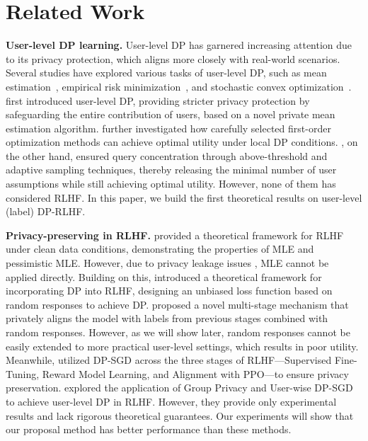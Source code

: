 \section{Related Work}
\noindent \textbf{User-level DP learning. }
User-level DP has garnered increasing attention due to its privacy protection, which aligns more closely with real-world scenarios. Several studies have explored various tasks of user-level DP, such as mean estimation~\cite{userleveldp1}, empirical risk minimization~\cite{userleveldp1}, and stochastic convex optimization~\cite{userleveldp2,userleveldp}. \citealt{userleveldp1} first introduced user-level DP, providing stricter privacy protection by safeguarding the entire contribution of users, based on a novel private mean estimation algorithm. \citealt{userleveldp2} further investigated how carefully selected first-order optimization methods can achieve optimal utility under local DP conditions. \citealt{userleveldp}, on the other hand, ensured query concentration through above-threshold and adaptive sampling techniques, thereby releasing the minimal number of user assumptions while still achieving optimal utility. However, none of them has considered RLHF. In this paper, we build the first theoretical results on user-level (label) DP-RLHF. 

\noindent \textbf{Privacy-preserving in RLHF.}
\citealt{kwise} provided a theoretical framework for RLHF under clean data conditions, demonstrating the properties of MLE and pessimistic MLE. However, due to privacy leakage issues \cite{li2023multi}, MLE cannot be applied directly. Building on this, \citealt{rewarddp} introduced a theoretical framework for incorporating DP into RLHF, designing an unbiased loss function based on random responses to achieve DP.   \citealt{PROPSdp} proposed a novel multi-stage mechanism that privately aligns the model with labels from previous stages combined with random responses. However, as we will show later, random responses cannot be easily extended to more practical user-level settings, which results in poor utility. Meanwhile, \citealt{rlhfdp23} utilized DP-SGD across the three stages of RLHF—Supervised Fine-Tuning, Reward Model Learning, and Alignment with PPO—to ensure privacy preservation. \citealt{userlevelrdplhf} explored the application of Group Privacy and User-wise DP-SGD to achieve user-level DP in RLHF. However, they provide only experimental results and lack rigorous theoretical guarantees. Our experiments will show that our proposal method has better performance than these methods.  


